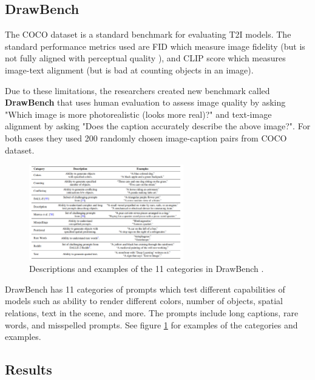 \subsection{DrawBench}

The COCO dataset \cite{coco_dataset} is a standard benchmark for evaluating T2I models. The standard performance metrics used are FID \cite{fid_score} which measure image fidelity (but is not fully aligned with perceptual quality \cite{perceptual_quality}), and CLIP score \cite{openai_clip} which measures image-text alignment (but is bad at counting objects in an image).

Due to these limitations, the researchers created new benchmark called \textbf{DrawBench} that uses human evaluation to assess image quality by asking "Which image is more photorealistic (looks more real)?" and text-image alignment by asking "Does the caption accurately describe the above image?". For both cases they used 200 randomly chosen image-caption pairs from COCO dataset.

\begin{figure}
    \centering
    \includegraphics[width=0.6\textwidth]{images/imagen/drawbench_categories.png}
    \caption{Descriptions and examples of the 11 categories in DrawBench \cite{imagen}.}
    \label{fig:imagen_drawbench_categories}
\end{figure}

DrawBench has 11 categories of prompts which test different capabilities of models such as ability to render different colors, number of objects, spatial relations, text in the scene, and more. The prompts include long captions, rare words, and misspelled prompts. See figure \ref{fig:imagen_drawbench_categories} for examples of the categories and examples.














\subsection{Results}

